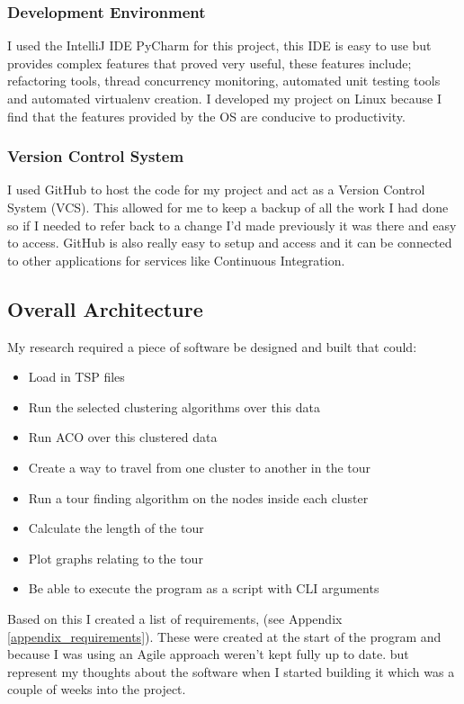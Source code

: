 \subsubsection{Development Environment}

I used the IntelliJ IDE PyCharm for this project\cite{pycharmide}, this IDE is easy to use but provides complex features that proved very useful, these features include; refactoring tools, thread concurrency monitoring, automated unit testing tools and automated virtualenv creation. I developed my project on Linux because I find that the features provided by the OS are conducive to productivity.

\subsubsection{Version Control System}
I used GitHub\cite{github} to host the code for my project and act as a Version Control System (VCS). This allowed for me to keep a backup of all the work I had done so if I needed to refer back to a change I'd made previously it was there and easy to access. GitHub is also really easy to setup and access and it can be connected to other applications for services like Continuous Integration.

\subsection{Overall Architecture}

My research required a piece of software be designed and built that could:

\begin{itemize}
    \item Load in TSP files
    \item Run the selected clustering algorithms over this data
    \item Run ACO over this clustered data
    \item Create a way to travel from one cluster to another in the tour
    \item Run a tour finding algorithm on the nodes inside each cluster
    \item Calculate the length of the tour
    \item Plot graphs relating to the tour
    \item Be able to execute the program as a script with CLI arguments
\end{itemize}

Based on this I created a list of requirements, (see Appendix \ref{appendix_requirements}). These were created at the start of the program and because I was using an Agile approach weren't kept fully up to date. but represent my thoughts about the software when I started building it which was a couple of weeks into the project.

